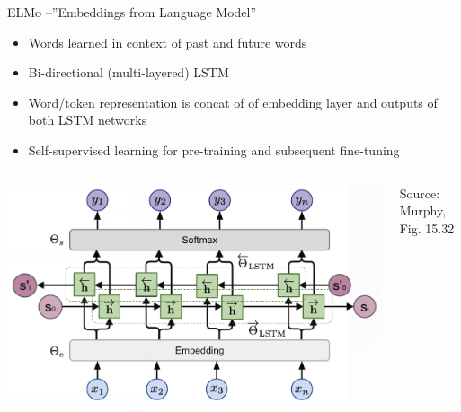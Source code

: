 \documentclass[ignorenonframetext,xcolor=x11names]{beamer}
\begin{document}
\begin{frame}{ELMo --''Embeddings from Language Model''}

\begin{itemize}
   \item Words learned in context of past and future words
   \item Bi-directional (multi-layered) LSTM
   \item Word/token representation is concat of of embedding layer and outputs of both LSTM networks
   \item Self-supervised learning for pre-training and subsequent fine-tuning
\end{itemize}

\begin{columns}
\begin{column}{.8\textwidth}
\includegraphics[width=\textwidth]{murphy_15_32.png}
\end{column}
\begin{column}{.2\textwidth}
\scriptsize Source: Murphy, Fig. 15.32 \normalsize
\end{column}
\end{columns}
\end{frame}
\end{document}

